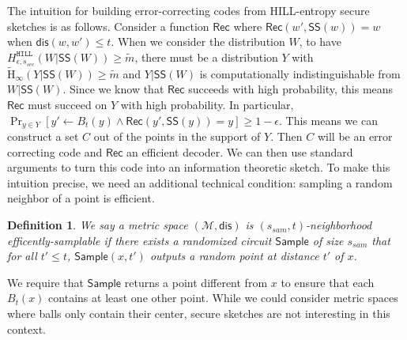 \documentclass[11pt]{article}
\newcommand{\class}[1]{{\ensuremath{\mathsf{#1}}}}
\newcommand{\sketch}{\ensuremath{\class{SS}}\xspace}
\newcommand{\rec}{\ensuremath{\class{Rec}}\xspace}
\newcommand{\sample}{\ensuremath{\class{Sample}}\xspace}
\newcommand{\dis}{\ensuremath{\mathsf{dis}}}
\newcommand{\hill}{\ensuremath{\mathtt{HILL}}\xspace}
\newcommand{\Hav}{\tilde{\mathrm{H}}_\infty}
\newtheorem{definition}[theorem]{Definition}
\newcommand{\authnote}[2]{{\textcolor{red}{\textsf{#1 notes: }\textcolor{blue}{ #2}}\marginpar{\textcolor{red}{\textbf{!!!!!}}}}}
\newcommand{\authnote}[2]{}
\newcommand{\lnote}[1]{{\authnote{Leo}{#1}}}
\begin{document}
The intuition for building error-correcting codes from HILL-entropy secure sketches is as follows. Consider a function $\rec$ where $\rec (w', \sketch(w)) = w$ when $\dis(w, w')\leq t$.  When we consider the distribution $W$, to have  $H^{\hill}_{\epsilon, s_{sec}}(W|\sketch(W))\ge \tilde{m}$, there must be a distribution $Y$ with $\Hav(Y | \sketch(W))\geq \tilde{m}$ and $Y| \sketch(W)$ is computationally indistinguishable from $W | \sketch(W)$.  Since we know that $\rec$ succeeds with high probability, this means $\rec$ must succeed on $Y$ with high probability.  In particular, $\Pr_{y\in Y} [y'\leftarrow B_t(y) \wedge \rec(y', \sketch(y)) = y ]\geq 1-\epsilon$.  This means we can construct a set $C$ out of the points in the support of $Y$.  Then $C$ will be an error correcting code and $\rec$ an efficient decoder.  We can then use standard arguments to turn this code into an information theoretic sketch.  
To make this intuition precise, we need an additional technical condition:  sampling a random neighbor of a point is efficient.
\begin{definition}
We say a metric space $(\mathcal{M}, \dis)$ is $(s_{sam}, t)$-\emph{neighborhood efficently-samplable} if there exists a randomized circuit $\sample$ of size $s_{sam}$ that for all $t'\leq t$, $\sample (x, t')$ outputs a random point at distance $t'$ of $x$.  
\end{definition}
We require that \sample returns a point different from $x$ to ensure that each $B_t(x)$ contains at least one other point.  While we could consider metric spaces where balls only contain their center, secure sketches are not interesting in this context.
\end{document}
